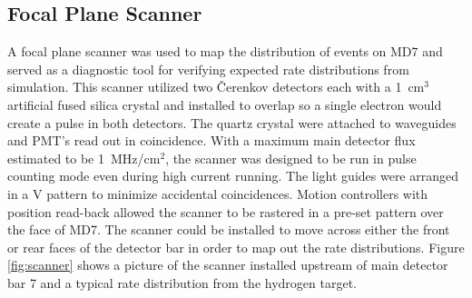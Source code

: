 \subsection{Focal Plane Scanner}
A focal plane scanner was used to map the distribution of events on MD7 and served as a diagnostic tool for verifying expected rate distributions from simulation. This scanner utilized two \v Cerenkov detectors each with a 1~cm$^3$ artificial fused silica crystal and installed to overlap so a single electron would create a pulse in both detectors. The quartz crystal were attached to waveguides and PMT's read out in coincidence. With a maximum main detector flux estimated to be 1~MHz/cm$^2$, the scanner was designed to be run in pulse counting mode even during high current running. The light guides were arranged in a V pattern to minimize accidental coincidences. Motion controllers with position read-back allowed the scanner to be rastered in a pre-set pattern over the face of MD7. The scanner could be installed to move across either the front or rear faces of the detector bar in order to map out the rate distributions. Figure \ref{fig:scanner} shows a picture of the scanner installed upstream of main detector bar 7 and a typical rate distribution from the hydrogen target.
